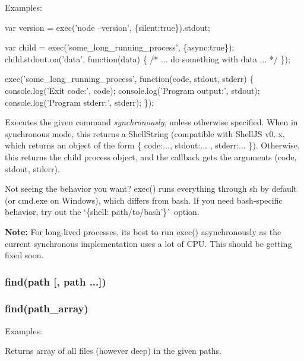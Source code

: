 Examples\+:


\begin{DoxyCode}
var version = exec('node --version', \{silent:true\}).stdout;

var child = exec('some\_long\_running\_process', \{async:true\});
child.stdout.on('data', function(data) \{
  /* ... do something with data ... */
\});

exec('some\_long\_running\_process', function(code, stdout, stderr) \{
  console.log('Exit code:', code);
  console.log('Program output:', stdout);
  console.log('Program stderr:', stderr);
\});
\end{DoxyCode}


Executes the given {\ttfamily command} {\itshape synchronously}, unless otherwise specified. When in synchronous mode, this returns a Shell\+String (compatible with Shell\+JS v0..\+x, which returns an object of the form {\ttfamily \{ code\+:..., stdout\+:... , stderr\+:... \}}). Otherwise, this returns the child process object, and the {\ttfamily callback} gets the arguments {\ttfamily (code, stdout, stderr)}.

Not seeing the behavior you want? {\ttfamily exec()} runs everything through {\ttfamily sh} by default (or {\ttfamily cmd.\+exe} on Windows), which differs from {\ttfamily bash}. If you need bash-\/specific behavior, try out the `\{shell\+: \textquotesingle{}path/to/bash'\}\`{} option.

{\bfseries Note\+:} For long-\/lived processes, it\textquotesingle{}s best to run {\ttfamily exec()} asynchronously as the current synchronous implementation uses a lot of C\+PU. This should be getting fixed soon.

\subsubsection*{find(path \mbox{[}, path ...\mbox{]})}

\subsubsection*{find(path\+\_\+array)}

Examples\+:




Returns array of all files (however deep) in the given paths.


